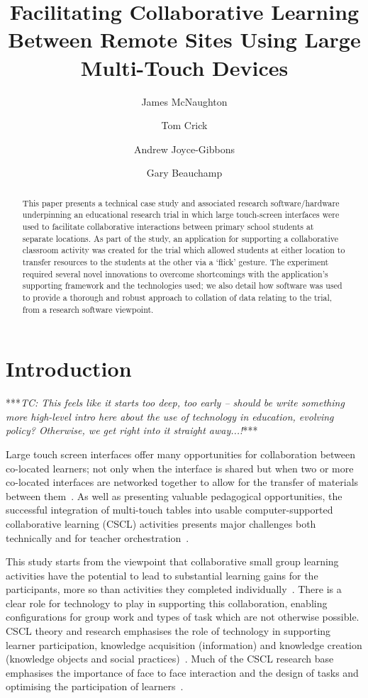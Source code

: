 \documentclass[a4paper,11pt]{article}
\title{Facilitating Collaborative Learning Between Remote Sites Using Large Multi-Touch Devices}
\author[1]{James McNaughton}
\author[2]{Tom Crick}
\author[3]{Andrew Joyce-Gibbons}
\author[4]{Gary Beauchamp}
\affil[1,3]{School of Education, Durham University, UK}
\affil[2]{Department of Computing \& Information Systems, Cardiff
  Metropolitan University, UK}
\affil[4]{School of Education, Cardiff Metropolitan University, UK}
\affil[1]{\protect\url{j.a.mcnaughton@durham.ac.uk}}
\affil[2]{\protect\url{tcrick@cardiffmet.ac.uk}}
\affil[3]{\protect\url{andrew.joyce-gibbons@durham.ac.uk}}
\affil[4]{\protect\url{gbeauchamp@cardiffmet.ac.uk}}
\date{ }
\begin{document}
\maketitle

\begin{abstract}
This paper presents a technical case study and associated research software/hardware underpinning an educational research trial in which large touch-screen interfaces were used to facilitate collaborative interactions between primary school students at separate locations.
As part of the study, an application for supporting a collaborative classroom activity was created for the trial which allowed students at either location to transfer resources to the students at the other via a `flick' gesture.
The experiment required several novel innovations to overcome shortcomings with the application's supporting framework and the technologies used; we also detail how software was used to provide a thorough and robust approach to collation of data relating to the trial, from a research software viewpoint.
\end{abstract}

\section{Introduction}

***{\emph{TC: This feels like it starts too deep, too early -- should be write something more high-level intro here about the use of technology in education, evolving policy? Otherwise, we get right into it straight away...!}}***

Large touch screen interfaces offer many opportunities for collaboration between co-located learners; not only when the interface is shared but when two or more co-located interfaces are networked together to allow for the transfer of materials between them~\cite{kharrufa:2013,kreitmayer:2013}.
As well as presenting valuable pedagogical opportunities, the successful integration of multi-touch tables into usable computer-supported collaborative learning (CSCL) activities presents major challenges both technically and for teacher orchestration~\cite{dillenbourg:2011}. 

This study starts from the viewpoint that collaborative small group learning activities have the potential to lead to substantial learning gains for the participants, more so than activities they completed individually~\cite{odonnell:2013,barron:2008}.
There is a clear role for technology to play in supporting this collaboration, enabling configurations for group work and types of task which are not otherwise possible.
CSCL theory and research emphasises the role of technology in supporting learner participation, knowledge acquisition (information) and knowledge creation (knowledge objects and social practices)~\cite{lipponen:2004}.
Much of the CSCL research base emphasises the importance of face to face interaction and the design of tasks and optimising the participation of learners~\cite{stahl:2014}.
\end{document}
